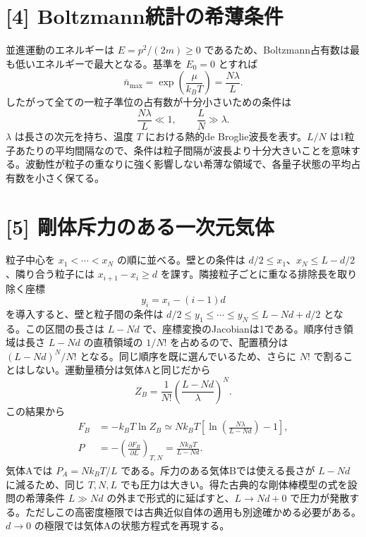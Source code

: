 \documentclass[11pt,a4paper]{article}
\begin{document}
\section*{[4] Boltzmann統計の希薄条件}
並進運動のエネルギーは $E=p^2/(2m)\ge0$ であるため、Boltzmann占有数は最も低いエネルギーで最大となる。基準を $E_0=0$ とすれば
\begin{equation}
  \bar n_{\mathrm{max}}
  =\exp\!\left(\frac{\mu}{k_BT}\right)
  =\frac{N\lambda}{L}.
\end{equation}
したがって全ての一粒子準位の占有数が十分小さいための条件は
\begin{equation}
  \boxed{\frac{N\lambda}{L}\ll1,\qquad
  \frac{L}{N}\gg\lambda.}
\end{equation}
$\lambda$ は長さの次元を持ち、温度 $T$ における熱的de Broglie波長を表す。$L/N$ は1粒子あたりの平均間隔なので、条件は粒子間隔が波長より十分大きいことを意味する。波動性が粒子の重なりに強く影響しない希薄な領域で、各量子状態の平均占有数を小さく保てる。

\section*{[5] 剛体斥力のある一次元気体}
粒子中心を $x_1<\cdots<x_N$ の順に並べる。壁との条件は $d/2\le x_1$、$x_N\le L-d/2$、隣り合う粒子には $x_{i+1}-x_i\ge d$ を課す。隣接粒子ごとに重なる排除長を取り除く座標
\begin{equation}
  y_i=x_i-(i-1)d
\end{equation}
を導入すると、壁と粒子間の条件は $d/2\le y_1\le\cdots\le y_N\le L-Nd+d/2$ となる。この区間の長さは $L-Nd$ で、座標変換のJacobianは1である。順序付き領域は長さ $L-Nd$ の直積領域の $1/N!$ を占めるので、配置積分は $(L-Nd)^N/N!$ となる。同じ順序を既に選んでいるため、さらに $N!$ で割ることはしない。運動量積分は気体Aと同じだから
\begin{equation}
  \boxed{Z_B=\frac{1}{N!}\left(\frac{L-Nd}{\lambda}\right)^N.}
\end{equation}
この結果から
\begin{align}
  F_B&=-k_BT\ln Z_B
  \simeq Nk_BT\left[\ln\!\left(\frac{N\lambda}{L-Nd}\right)-1\right],\\
  P&=-\left(\frac{\partial F_B}{\partial L}\right)_{T,N}
   =\boxed{\frac{Nk_BT}{L-Nd}}.
\end{align}
気体Aでは $P_A=Nk_BT/L$ である。斥力のある気体Bでは使える長さが $L-Nd$ に減るため、同じ $T,N,L$ でも圧力は大きい。得た古典的な剛体棒模型の式を設問の希薄条件 $L\gg Nd$ の外まで形式的に延ばすと、$L\to Nd+0$ で圧力が発散する。ただしこの高密度極限では古典近似自体の適用も別途確かめる必要がある。$d\to0$ の極限では気体Aの状態方程式を再現する。
\end{document}
